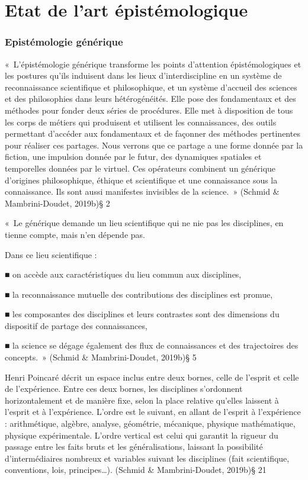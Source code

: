 \documentclass[
  letterpaper,
  DIV=11,
  numbers=noendperiod]{scrreprt}
\begin{document}
\hypertarget{sec-etatArtEpistemo}{%
\chapter{Etat de l'art épistémologique}\label{sec-etatArtEpistemo}}

\hypertarget{epistuxe9mologie-guxe9nuxe9rique}{%
\subsection{Epistémologie
générique}\label{epistuxe9mologie-guxe9nuxe9rique}}

«~L'épistémologie générique transforme les points d'attention
épistémologiques et les postures qu'ils induisent dans les lieux
d'interdiscipline en un système de reconnaissance scientifique et
philosophique, et un système d'accueil des sciences et des philosophies
dans leurs hétérogénéités. Elle pose des fondamentaux et des méthodes
pour fonder deux séries de procédures. Elle met à disposition de tous
les corps de métiers qui produisent et utilisent les connaissances, des
outils permettant d'accéder aux fondamentaux et de façonner des méthodes
pertinentes pour réaliser ces partages. Nous verrons que ce partage a
une forme donnée par la fiction, une impulsion donnée par le futur, des
dynamiques spatiales et temporelles données par le virtuel. Ces
opérateurs combinent un générique d'origines philosophique, éthique et
scientifique et une connaissance sous la connaissance. Ils sont aussi
manifestes invisibles de la science.~» (Schmid \& Mambrini-Doudet,
2019b)§ 2

«~Le générique demande un lieu scientifique qui ne nie pas les
disciplines, en tienne compte, mais n'en dépende pas.

Dans ce lieu scientifique :

■ on accède aux caractéristiques du lieu commun aux disciplines,

■ la reconnaissance mutuelle des contributions des disciplines est
promue,

■ les composantes des disciplines et leurs contrastes sont des
dimensions du dispositif de partage des connaissances,

■ la science se dégage également des flux de connaissances et des
trajectoires des concepts.~» (Schmid \& Mambrini-Doudet, 2019b)§ 5

Henri Poincaré décrit un espace inclus entre deux bornes, celle de
l'esprit et celle de l'expérience. Entre ces deux bornes, les
disciplines s'ordonnent horizontalement et de manière fixe, selon la
place relative qu'elles laissent à l'esprit et à l'expérience. L'ordre
est le suivant, en allant de l'esprit à l'expérience : arithmétique,
algèbre, analyse, géométrie, mécanique, physique mathématique, physique
expérimentale. L'ordre vertical est celui qui garantit la rigueur du
passage entre les faits bruts et les généralisations, laissant la
possibilité d'intermédiaires nombreux et variables suivant les
disciplines (fait scientifique, conventions, lois, principes\ldots).
(Schmid \& Mambrini-Doudet, 2019b)§ 21
\end{document}
